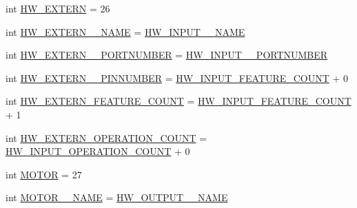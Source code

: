\begin{DoxyCompactItemize}
\item 
int \hyperlink{interfaceshootingmachineemfmodel_1_1_shootingmachineemfmodel_package_a58063da7516b27741575dfd0ca3badff}{H\-W\-\_\-\-E\-X\-T\-E\-R\-N} = 26
\item 
int \hyperlink{interfaceshootingmachineemfmodel_1_1_shootingmachineemfmodel_package_ac5a4093023cc1e99970cb1c2e25e6fd1}{H\-W\-\_\-\-E\-X\-T\-E\-R\-N\-\_\-\-\_\-\-N\-A\-M\-E} = \hyperlink{interfaceshootingmachineemfmodel_1_1_shootingmachineemfmodel_package_aca3df42c3daea63181ee2a2aa5ed1fac}{H\-W\-\_\-\-I\-N\-P\-U\-T\-\_\-\-\_\-\-N\-A\-M\-E}
\item 
int \hyperlink{interfaceshootingmachineemfmodel_1_1_shootingmachineemfmodel_package_a530aa534b9c5ae08f03cac6002c6b728}{H\-W\-\_\-\-E\-X\-T\-E\-R\-N\-\_\-\-\_\-\-P\-O\-R\-T\-N\-U\-M\-B\-E\-R} = \hyperlink{interfaceshootingmachineemfmodel_1_1_shootingmachineemfmodel_package_ac54ab200e6b01aa749998ba59d67d36b}{H\-W\-\_\-\-I\-N\-P\-U\-T\-\_\-\-\_\-\-P\-O\-R\-T\-N\-U\-M\-B\-E\-R}
\item 
int \hyperlink{interfaceshootingmachineemfmodel_1_1_shootingmachineemfmodel_package_a9246025f6024796c44d54f6b4ac9533f}{H\-W\-\_\-\-E\-X\-T\-E\-R\-N\-\_\-\-\_\-\-P\-I\-N\-N\-U\-M\-B\-E\-R} = \hyperlink{interfaceshootingmachineemfmodel_1_1_shootingmachineemfmodel_package_a535000a6deb669d11da173c3d44815a2}{H\-W\-\_\-\-I\-N\-P\-U\-T\-\_\-\-F\-E\-A\-T\-U\-R\-E\-\_\-\-C\-O\-U\-N\-T} + 0
\item 
int \hyperlink{interfaceshootingmachineemfmodel_1_1_shootingmachineemfmodel_package_a4814c4e8a245ab5d9c7ca95d2268c71f}{H\-W\-\_\-\-E\-X\-T\-E\-R\-N\-\_\-\-F\-E\-A\-T\-U\-R\-E\-\_\-\-C\-O\-U\-N\-T} = \hyperlink{interfaceshootingmachineemfmodel_1_1_shootingmachineemfmodel_package_a535000a6deb669d11da173c3d44815a2}{H\-W\-\_\-\-I\-N\-P\-U\-T\-\_\-\-F\-E\-A\-T\-U\-R\-E\-\_\-\-C\-O\-U\-N\-T} + 1
\item 
int \hyperlink{interfaceshootingmachineemfmodel_1_1_shootingmachineemfmodel_package_a509c88e538f3bdfaec8ece9d4893b897}{H\-W\-\_\-\-E\-X\-T\-E\-R\-N\-\_\-\-O\-P\-E\-R\-A\-T\-I\-O\-N\-\_\-\-C\-O\-U\-N\-T} = \hyperlink{interfaceshootingmachineemfmodel_1_1_shootingmachineemfmodel_package_af19839a18788f1df9c7076b1f331b660}{H\-W\-\_\-\-I\-N\-P\-U\-T\-\_\-\-O\-P\-E\-R\-A\-T\-I\-O\-N\-\_\-\-C\-O\-U\-N\-T} + 0
\item 
int \hyperlink{interfaceshootingmachineemfmodel_1_1_shootingmachineemfmodel_package_a9144b6eba68be5a47fdd021422d73dbd}{M\-O\-T\-O\-R} = 27
\item 
int \hyperlink{interfaceshootingmachineemfmodel_1_1_shootingmachineemfmodel_package_a0a00df33c791b334924d8650e4c3a8bb}{M\-O\-T\-O\-R\-\_\-\-\_\-\-N\-A\-M\-E} = \hyperlink{interfaceshootingmachineemfmodel_1_1_shootingmachineemfmodel_package_a82c44c284e4ef61163abe3704089bfad}{H\-W\-\_\-\-O\-U\-T\-P\-U\-T\-\_\-\-\_\-\-N\-A\-M\-E}

\end{DoxyCompactItemize}
